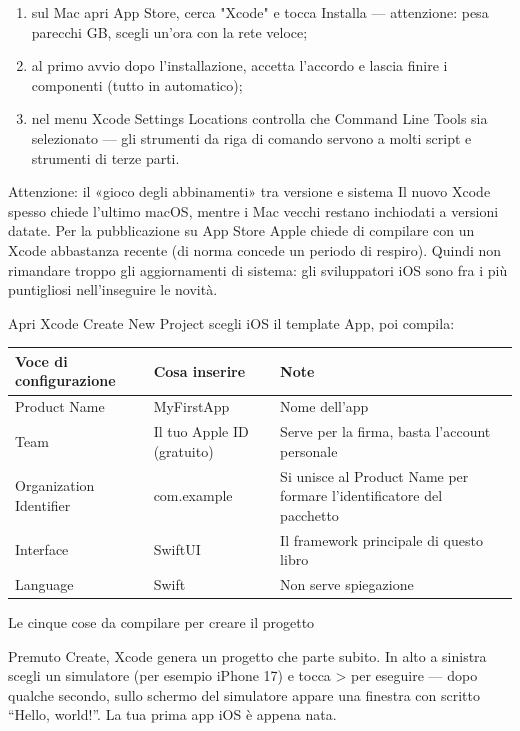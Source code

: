 \begin{enumerate}
  \item sul Mac apri App Store, cerca "Xcode" e tocca Installa — attenzione: pesa parecchi GB, scegli un'ora con la rete veloce;
  \item al primo avvio dopo l'installazione, accetta l'accordo e lascia finire i componenti (tutto in automatico);
  \item nel menu Xcode Settings Locations controlla che Command Line Tools sia selezionato — gli strumenti da riga di comando servono a molti script e strumenti di terze parti.
\end{enumerate}

\begin{tcbwarn}{Attenzione: il «gioco degli abbinamenti» tra versione e sistema}
Il nuovo Xcode spesso chiede l'ultimo macOS, mentre i Mac vecchi restano inchiodati a versioni datate. Per la pubblicazione su App Store Apple chiede di compilare con un Xcode abbastanza recente (di norma concede un periodo di respiro). Quindi non rimandare troppo gli aggiornamenti di sistema: gli sviluppatori iOS sono fra i più puntigliosi nell'inseguire le novità.

\end{tcbwarn}


Apri Xcode Create New Project scegli iOS il template App, poi compila:

\begin{center}
\begin{tabularx}{\linewidth}{|X|X|X|}
\hline
\textbf{Voce di configurazione} & \textbf{Cosa inserire} & \textbf{Note} \tabularnewline
\hline
Product Name & MyFirstApp & Nome dell'app \tabularnewline
Team & Il tuo Apple ID (gratuito) & Serve per la firma, basta l'account personale \tabularnewline
Organization Identifier & com.example & Si unisce al Product Name per formare l'identificatore del pacchetto \tabularnewline
Interface & SwiftUI & Il framework principale di questo libro \tabularnewline
Language & Swift & Non serve spiegazione \tabularnewline
\hline
\end{tabularx}
\end{center}

\begin{center}\small\color{gray}Le cinque cose da compilare per creare il progetto\end{center}

Premuto Create, Xcode genera un progetto che parte subito. In alto a sinistra scegli un simulatore (per esempio iPhone 17) e tocca > per eseguire — dopo qualche secondo, sullo schermo del simulatore appare una finestra con scritto “Hello, world!”. La tua prima app iOS è appena nata.

